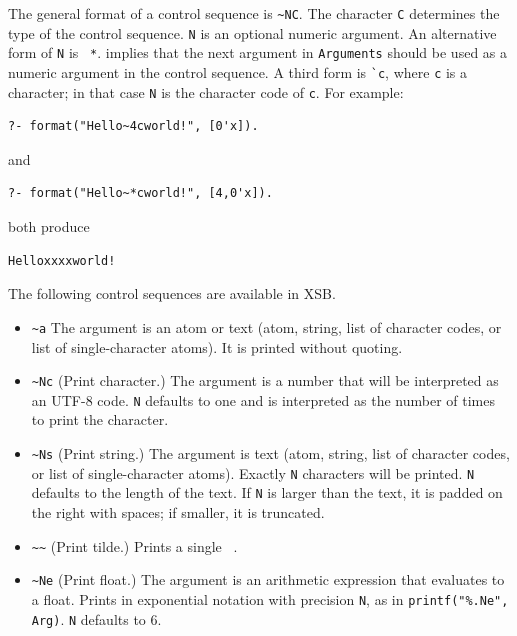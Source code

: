 \begin{description}
The general format of a control sequence is \verb|~NC|.  The character
{\tt C} determines the type of the control sequence.  {\tt N} is an
optional numeric argument.  An alternative form of {\tt N} is {\tt
*}. {\tt *} implies that the next argument in {\tt Arguments} should
be used as a numeric argument in the control sequence.  A third form
is \verb|`c|, where {\tt c} is a character; in that case {\tt N} is the
character code of {\tt c}.  For example:

\begin{verbatim}
?- format("Hello~4cworld!", [0'x]).
\end{verbatim}

\noindent
and

\begin{verbatim}
?- format("Hello~*cworld!", [4,0'x]).
\end{verbatim}

\noindent
both produce

\begin{verbatim}
Helloxxxxworld!
\end{verbatim}

The following control sequences are available in XSB.

\begin{itemize}

\item \verb|~a|
The argument is an atom or text (atom, string, list of character codes,
or list of single-character atoms).  It is printed without quoting.

\item \verb|~Nc|
(Print character.)  The argument is a number that will be interpreted as an
UTF-8 code. {\tt N} defaults to one and is interpreted as the number of
times to print the character.  

\item \verb|~Ns|
(Print string.) The argument is text (atom, string, list of character
codes, or list of single-character atoms).  Exactly {\tt N} characters
will be printed. {\tt N} defaults to the length of the text.  If {\tt N}
is larger than the text, it is padded on the right with spaces; if
smaller, it is truncated.

\item \verb|~~|
(Print tilde.)  Prints a single {\tt ~}.

\item \verb|~Ne|
(Print float.) The argument is an arithmetic expression that evaluates
to a float.  Prints in exponential notation with precision {\tt N}, as
in \verb|printf("%.Ne", Arg)|.  {\tt N} defaults to 6.


\end{itemize}
\end{description}
